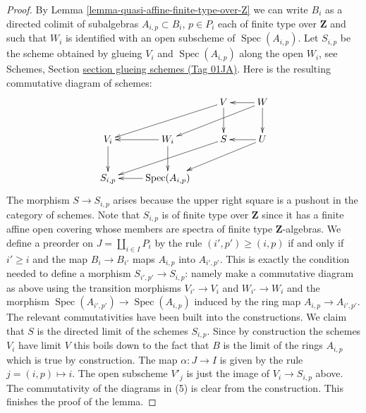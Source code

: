 \documentclass{amsart}
\theoremstyle{plain}
\theoremstyle{definition}
\theoremstyle{remark}
\numberwithin{equation}{subsection}
\def\Spec{\mathop{\mathrm{Spec}}}
\begin{document}
\begin{proof}
\medskip\noindent
By Lemma \ref{lemma-quasi-affine-finite-type-over-Z}
we can write $B_i$ as a directed colimit of subalgebras
$A_{i, p} \subset B_i$, $p \in P_i$ each
of finite type over $\mathbf{Z}$ and such that $W_i$ is
identified with an open subscheme of $\Spec(A_{i, p})$.
Let $S_{i, p}$ be the scheme obtained by glueing
$V_i$ and $\Spec(A_{i, p})$ along the open $W_i$, see
Schemes, Section \href{https://stacks.math.columbia.edu/tag/01JA}{section glueing schemes (Tag 01JA)}.
Here is the resulting commutative diagram of schemes:
$$
\xymatrix{
& & V \ar[lld] \ar[d] & W \ar[l] \ar[lld] \ar[d] \\
V_i \ar[d] & W_i \ar[l] \ar[d] & S \ar[lld] & U \ar[lld] \ar[l] \\
S_{i, p} & \Spec(A_{i, p}) \ar[l]
}
$$
The morphism $S \to S_{i, p}$ arises because the upper right
square is a pushout in the category of schemes.
Note that $S_{i, p}$ is of finite type over $\mathbf{Z}$ since
it has a finite affine open covering whose members are
spectra of finite type $\mathbf{Z}$-algebras.
We define a preorder on $J = \coprod_{i \in I} P_i$
by the rule $(i', p') \geq (i, p)$ if and only if
$i' \geq i$ and the map $B_i \to B_{i'}$ maps $A_{i, p}$ into
$A_{i', p'}$. This is exactly the condition needed to
define a morphism $S_{i', p'} \to S_{i, p}$: namely make a commutative
diagram as above using the transition morphisms $V_{i'} \to V_i$
and $W_{i'} \to W_i$ and
the morphism $\Spec(A_{i', p'}) \to \Spec(A_{i, p})$ induced
by the ring map $A_{i, p} \to A_{i', p'}$. The relevant commutativities
have been built into the constructions.
We claim that $S$ is the directed limit of the schemes $S_{i, p}$.
Since by construction the schemes $V_i$ have limit $V$ this boils
down to the fact that $B$ is the limit of the rings $A_{i, p}$
which is true by construction. The map $\alpha : J \to I$ is given
by the rule $j = (i, p) \mapsto i$. The open subscheme $V'_j$ is
just the image of $V_i \to S_{i, p}$ above. The commutativity of
the diagrams in (5) is clear from the construction.
This finishes the proof of the lemma.
\end{proof}
\end{document}
